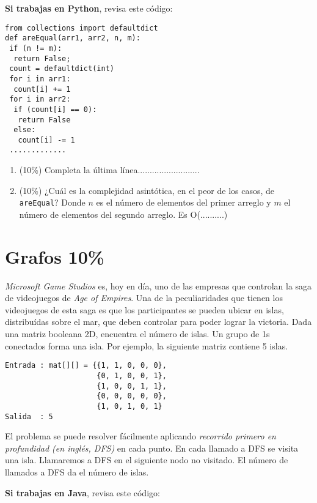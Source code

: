 \documentclass[10 pt]{article}
\begin{document}
\begin{multicols}{2}
\textbf{Si trabajas en Python}, revisa este código:

{\footnotesize
\begin{lstlisting}
from collections import defaultdict 
def areEqual(arr1, arr2, n, m): 
 if (n != m):  
  return False; 
 count = defaultdict(int) 
 for i in arr1: 
  count[i] += 1
 for i in arr2: 
  if (count[i] == 0): 
   return False
  else: 
   count[i] -= 1
 .............
\end{lstlisting}
}

\begin{enumerate}[label=\Alph*]
	\item (10\%) Completa la última línea..........................
	\item (10\%) ¿Cuál es la complejidad asintótica, en el peor de los casos, de \texttt{areEqual}? Donde $n$ es el número de elementos del primer arreglo y $m$ el número de elementos del segundo arreglo. Es O(..........)
\end{enumerate}



\section{Grafos 10\%}
\textit{Microsoft Game Studios} es, hoy en día, uno de las empresas que controlan la saga de videojuegos de \textit{Age of Empires}. Una de la peculiaridades que tienen los videojuegos
de esta saga es que los participantes se pueden ubicar en islas, distribuídas sobre el mar, que deben controlar para poder lograr la victoria. Dada una matriz booleana 2D, encuentra el número de islas. Un grupo de 1s conectados forma una isla. Por ejemplo, la siguiente matriz contiene 5 islas.
\begin{verbatim}
Entrada : mat[][] = {{1, 1, 0, 0, 0},
                     {0, 1, 0, 0, 1},
                     {1, 0, 0, 1, 1},
                     {0, 0, 0, 0, 0},
                     {1, 0, 1, 0, 1} 
Salida  : 5
\end{verbatim}

El problema se puede resolver fácilmente aplicando \textit{recorrido primero en profundidad (en inglés, DFS)} en cada punto. En cada llamado a DFS se visita una isla. Llamaremos a DFS en el siguiente nodo no visitado. El número de llamados a DFS da el número de islas.

\textbf{Si trabajas en Java}, revisa este código:


\end{multicols}
\end{document}
